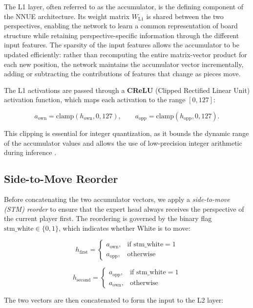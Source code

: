 The L1 layer, often referred to as the accumulator, is the defining component of the NNUE architecture. Its weight matrix $W_{\text{L1}}$ is shared between the two perspectives, enabling the network to learn a common representation of board structure while retaining perspective-specific information through the different input features. The sparsity of the input features allows the accumulator to be updated efficiently: rather than recomputing the entire matrix-vector product for each new position, the network maintains the accumulator vector incrementally, adding or subtracting the contributions of features that change as pieces move.

The L1 activations are passed through a \textbf{CReLU} (Clipped Rectified Linear Unit) activation function, which maps each activation to the range $[0, 127]$:

\[
a_{\text{own}} = \text{clamp}(h_{\text{own}}, 0, 127), \qquad a_{\text{opp}} = \text{clamp}(h_{\text{opp}}, 0, 127).
\]

This clipping is essential for integer quantization, as it bounds the dynamic range of the accumulator values and allows the use of low-precision integer arithmetic during inference \parencite{stockfishnnue}.

\subsection{Side-to-Move Reorder}

Before concatenating the two accumulator vectors, we apply a \emph{side-to-move (STM) reorder} to ensure that the expert head always receives the perspective of the current player first. The reordering is governed by the binary flag $\text{stm\_white} \in \{0,1\}$, which indicates whether White is to move:

\[
h_{\text{first}} = \begin{cases} a_{\text{own}}, & \text{if } \text{stm\_white} = 1 \\ a_{\text{opp}}, & \text{otherwise} \end{cases}
\]

\[
h_{\text{second}} = \begin{cases} a_{\text{opp}}, & \text{if } \text{stm\_white} = 1 \\ a_{\text{own}}, & \text{otherwise} \end{cases}
\]

The two vectors are then concatenated to form the input to the L2 layer:

